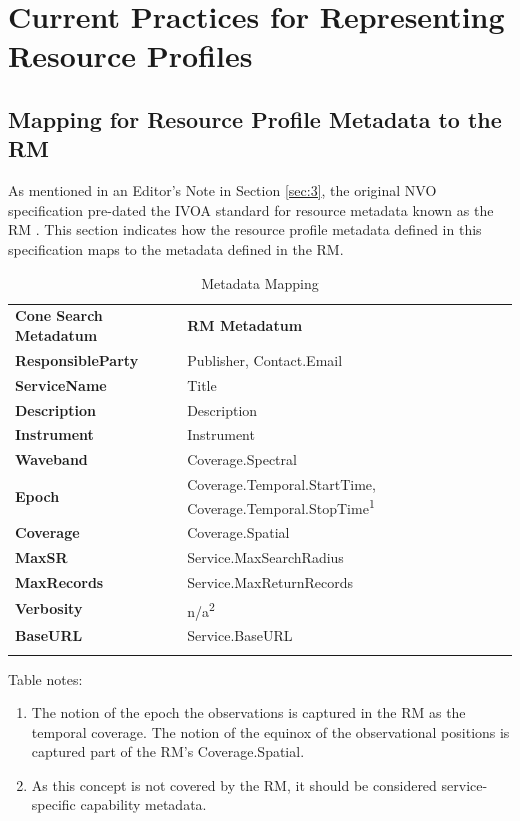 \documentclass[11pt,a4paper]{ivoa}
\begin{document}
\section{Current Practices for Representing Resource Profiles}

\subsection{Mapping for Resource Profile Metadata to the RM} 

As mentioned in an Editor's Note in Section \ref{sec:3}, the original NVO
specification pre-dated the IVOA standard for resource metadata known as
the RM \citep{2004ivoa.spec.0426H}. This section indicates how the
resource profile metadata defined in this specification maps to the
metadata defined in the RM. 

\begin{table}[th]
\begin{tabular}{p{}p{}}
\sptablerule
\textbf{Cone Search Metadatum} & \textbf{RM Metadatum}\\
\sptablerule
\textbf{ResponsibleParty} & Publisher, Contact.Email\\
\textbf{ServiceName} & Title\\
\textbf{Description} & Description\\
\textbf{Instrument} & Instrument\\
\textbf{Waveband} & Coverage.Spectral\\
\textbf{Epoch} & Coverage.Temporal.StartTime, Coverage.Temporal.StopTime\textsuperscript{1}\\
\textbf{Coverage} & Coverage.Spatial\\
\textbf{MaxSR} & Service.MaxSearchRadius\\
\textbf{MaxRecords} & Service.MaxReturnRecords\\
\textbf{Verbosity} & n/a\textsuperscript{2}\\
\textbf{BaseURL} & Service.BaseURL\\
\sptablerule
\label{table:b1meta}
\end{tabular} \caption{Metadata
Mapping} \end{table}

Table notes:
\begin{enumerate}
	\item The notion of
		the epoch the observations is captured in the RM as the temporal
		coverage. The notion of the equinox of the observational positions is
		captured part of the RM's Coverage.Spatial.
	\item As this concept is not
		covered by the RM, it should be considered service-specific capability
		metadata.
\end{enumerate}
\end{document}
